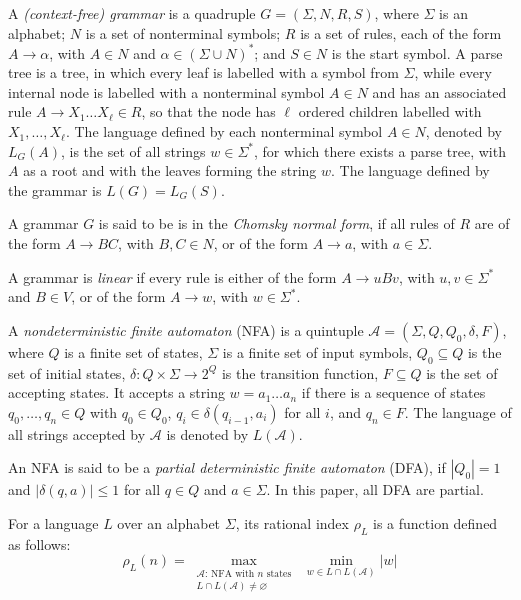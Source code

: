 \documentclass[runningheads]{llncs}
\renewcommand{\emptyset}{\varnothing}
\begin{document}
A \textit{(context-free) grammar} is a quadruple $G = (\Sigma, N, R, S)$,
where $\Sigma$ is an alphabet;
$N$ is a set of nonterminal symbols;
$R$ is a set of rules, each of the form $A \to \alpha$,
with $A \in N$ and $\alpha \in (\Sigma \cup N)^*$;
and $S \in N$ is the start symbol.
A parse tree is a tree, in which 
every leaf is labelled with a symbol from $\Sigma$,
while every internal node is labelled with a nonterminal symbol $A \in N$
and has an associated rule $A \to X_1 \ldots X_\ell \in R$,
so that the node has $\ell$ ordered children labelled with $X_1, \ldots, X_\ell$.
The language defined by each nonterminal symbol $A \in N$, denoted by $L_G(A)$,
is the set of all strings $w \in \Sigma^*$,
for which there exists a parse tree,
with $A$ as a root
and with the leaves forming the string $w$.
The language defined by the grammar is $L(G)=L_G(S)$.

A grammar $G$ is said to be is in the \textit{Chomsky normal form},
if all rules of $R$ are of the form
$A \to BC$, with $B, C \in N$, or of the form $A \to a$, with $a \in \Sigma$. 

A grammar is \emph{linear} if every rule
is either of the form $A \to uBv$, with $u,v \in \Sigma^*$ and $B \in V$,
or of the form $A \to w$, with $w \in \Sigma^*$.

A \textit{nondeterministic finite automaton} (NFA) is a quintuple
$\mathcal{A}=(\Sigma, Q, Q_0, \delta, F)$, where $Q$ is a finite set of states,
$\Sigma$ is a finite set of input symbols,
$Q_0 \subseteq Q$ is the set of initial states,
$\delta \colon Q \times \Sigma \to 2^Q$ is the transition function,
$F \subseteq Q$ is the set of accepting states.
It accepts a string $w=a_1 \ldots a_n$ if there is a sequence of states $q_0, \ldots, q_n \in Q$
with $q_0 \in Q_0$, $q_i \in \delta(q_{i-1}, a_i)$ for all $i$, and $q_n \in F$.
The language of all strings accepted by $\mathcal{A}$ is denoted by $L(\mathcal{A})$.

An NFA is said to be a \emph{partial deterministic finite automaton} (DFA),
if $|Q_0|=1$ and $|\delta(q, a)| \leqslant 1$ for all $q \in Q$ and $a \in \Sigma$.
In this paper, all DFA are partial.

For a language $L$ over an alphabet $\Sigma$,
its rational index $\rho_L$ is a function defined as follows:
\begin{equation*}
	\rho_L(n)
		=
	\max_{\substack{\mathcal{A} \text{: NFA with }n\text{ states} \\ L \cap L(\mathcal{A}) \neq \emptyset}}
	\;
	\min_{w \in L \cap L(\mathcal{A})}|w|
\end{equation*}
\end{document}
